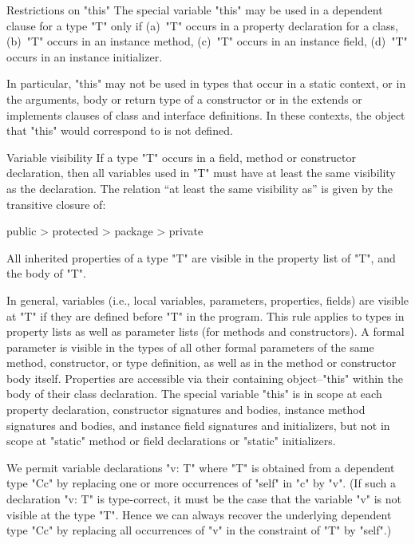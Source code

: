 \begin{staticrule}{Restrictions on \xcd"this"}
  The special variable \xcd"this" may be used in a dependent clause for a type \xcd"T"
  only if (a)~\xcd"T" occurs in a property declaration for a
  class, (b)~\xcd"T"
  occurs in an instance method, (c)~\xcd"T" occurs in an
  instance field, (d)~\xcd"T"
  occurs in an instance initializer.

  In particular, \xcd"this" may not be used in types that occur in a static
  context, or in the arguments, body or return type of a constructor or
  in the extends or implements clauses of class and interface
  definitions.  In these contexts, the object that \xcd"this" would
  correspond to is not defined.
\end{staticrule}

\begin{staticrule}{Variable visibility}
  If a type \xcd"T" occurs in a field, method or constructor
  declaration, then all variables used in \xcd"T" must have at least the
  same visibility as the declaration.  The relation ``at least the same
  visibility as'' is given by the transitive closure of:

\begin{xten}
public > protected > package > private
\end{xten}

All inherited properties of a type \xcd"T" are visible in the property
list of \xcd"T", and the body of \xcd"T".

\end{staticrule}

In general, variables (i.e., local variables, parameters,
properties, fields) are visible at
\xcd"T" if they are defined before \xcd"T" in the program. This rule applies to
types in property lists as well as parameter lists (for methods and
constructors).
A formal parameter is visible in the types of all other formal
parameters of the same method, constructor, or type definition,
as well as in the method or constructor body itself.
Properties are accessible via their containing object--\xcd"this"
within the body of their class declaration.  The special
variable \xcd"this" is in scope at each property
declaration, constructor signatures and bodies, instance method signatures
and bodies,
and instance field signatures and initializers, but not in scope
at \xcd"static" method or field declarations or \xcd"static"
initializers.  

We permit variable declarations \xcd"v: T" where \xcd"T" is obtained
from a dependent type \xcd"C{c}" by replacing one or more occurrences
of \xcd"self" in \xcd"c" by \xcd"v". (If such a declaration \xcd"v: T"
is type-correct, it must be the case that the variable \xcd"v" is not
visible at the type \xcd"T". Hence we can always recover the
underlying dependent type \xcd"C{c}" by replacing all occurrences of \xcd"v"
in the constraint of \xcd"T" by \xcd"self".)


